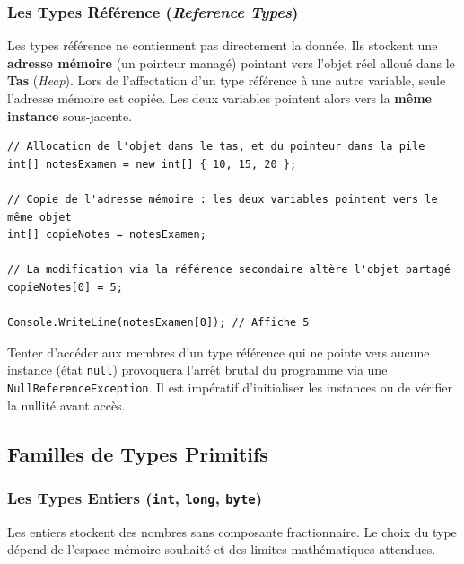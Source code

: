 \subsubsection{Les Types Référence (\emph{Reference Types})}
Les types référence ne contiennent pas directement la donnée. Ils stockent une \textbf{adresse mémoire} (un pointeur managé) pointant vers l'objet réel alloué dans le \textbf{Tas} (\emph{Heap}). 
Lors de l'affectation d'un type référence à une autre variable, seule l'adresse mémoire est copiée. Les deux variables pointent alors vers la \textbf{même instance} sous-jacente.

\begin{lstlisting}[caption={Comportement en mémoire des types référence (tas)}]
// Allocation de l'objet dans le tas, et du pointeur dans la pile
int[] notesExamen = new int[] { 10, 15, 20 };

// Copie de l'adresse mémoire : les deux variables pointent vers le même objet
int[] copieNotes = notesExamen;

// La modification via la référence secondaire altère l'objet partagé
copieNotes[0] = 5;

Console.WriteLine(notesExamen[0]); // Affiche 5
\end{lstlisting}

\begin{tcolorbox}[colback=backcolour,colframe=stringcolor,title=\textbf{Piège de l'ingénierie : L'Exception de Référence Nulle}]
    Tenter d'accéder aux membres d'un type référence qui ne pointe vers aucune instance (état \texttt{null}) provoquera l'arrêt brutal du programme via une \texttt{NullReferenceException}. Il est impératif d'initialiser les instances ou de vérifier la nullité avant accès.
\end{tcolorbox}

\subsection{Familles de Types Primitifs}

\subsubsection{Les Types Entiers (\texttt{int}, \texttt{long}, \texttt{byte})}
Les entiers stockent des nombres sans composante fractionnaire. Le choix du type dépend de l'espace mémoire souhaité et des limites mathématiques attendues.

